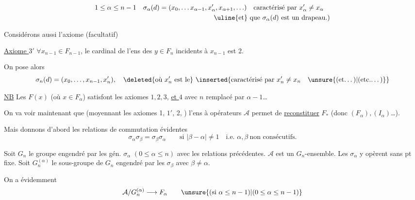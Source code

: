 \[
\begin{aligned}
1\leq\alpha\leq n-1\quad \sigma_\alpha(d)&=(x_0,\ldots x_{\alpha-1},x'_\alpha,x_{\alpha+1},\ldots)\quad\text{caractérisé par }x'_\alpha\ne x_\alpha\\
&\hspace{8em}\text{\uline{et}}\ \text{que }\sigma_\alpha(d)\ \text{est un drapeau.})
\end{aligned}
\]

Considérons aussi l'axiome (facultatif)

\uline{Axiome $3'$} $\forall x_{n-1}\in F_{n-1}$, le cardinal de l'ens des  $y\in F_n$ incidents à $x_{n-1}$ est 2.


On pose alors
\[
\sigma_n(d)=(x_0,\ldots,x_{n-1},x'_n),\quad \deleted{\text{où }x'_n\text{ est le}}\ \inserted{\text{caractérisé par }x'_n\ne x_n\quad\text{\unsure{(et\ldots)|(etc.\ldots)}}}
\]

\uline{NB} Les $F(x)$ (où $x\in F_\alpha$) satisfont les axiomes $1,2,3$, \uline{et $4$} avec $n$ remplacé par $\alpha-1$\ldots

On va voir maintenant que (moyennant les axiomes 1, $1'$, 2,  ) l'ens à opérateurs $\mathcal A$ permet de \uline{reconstituer} $F_*$ (donc $(F_\alpha),(I_\alpha)$\ldots).

  Mais donnons d'abord les relations de commutation évidentes
\[
 \sigma_\alpha\sigma_\beta=\sigma_\beta\sigma_\alpha\qquad\text{si }|\beta-\alpha|\ne1\quad\text{i.e. }\alpha,\beta\ \text{non consécutifs.}
\]

Soit $G_n$ le groupe engendré par les  gén. $\sigma_\alpha$ $(0\leq\alpha\leq n)$ avec les relations précédentes. $\mathcal A$ est un $G_n$-ensemble. Les $\sigma_\alpha$ y opèrent sans pt fixe. Soit $G_n^{(\alpha)}$  le sous-groupe de $G_n$ engendré par les $\sigma_\beta$ avec $\beta\ne\alpha$.

On a évidemment
\[
 \mathcal A/G_n^{(\alpha)}\longrightarrow F_\alpha\qquad\unsure{(\text{si }\alpha\leq n-1)|(0\leq\alpha\leq n-1)}
\]

